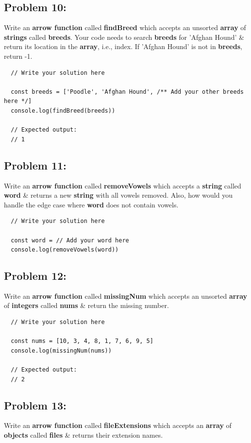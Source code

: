 \documentclass{article}
\begin{document}
\subsection*{Problem 10:} 
Write an \textbf{arrow function} called \textbf{findBreed} which accepts an unsorted \textbf{array} of \textbf{strings} called \textbf{breeds}. Your code needs to search \textbf{breeds} for 'Afghan Hound' \& return its location in the \textbf{array}, i.e., index. If 'Afghan Hound' is not in \textbf{breeds}, return -1.

\begin{verbatim}
  // Write your solution here

  const breeds = ['Poodle', 'Afghan Hound', /** Add your other breeds here */]
  console.log(findBreed(breeds)) 

  // Expected output:
  // 1
\end{verbatim}

\subsection*{Problem 11:} 
Write an \textbf{arrow function} called \textbf{removeVowels} which accepts a \textbf{string} called \textbf{word} \& returns a new \textbf{string} with all vowels removed. Also, how would you handle the edge case where \textbf{word} does not contain vowels.

\begin{verbatim}
  // Write your solution here

  const word = // Add your word here
  console.log(removeVowels(word))
\end{verbatim}

\subsection*{Problem 12:} 
Write an \textbf{arrow function} called \textbf{missingNum} which accepts an unsorted \textbf{array} of \textbf{integers} called \textbf{nums} \& return the missing number.

\begin{verbatim}
  // Write your solution here

  const nums = [10, 3, 4, 8, 1, 7, 6, 9, 5]
  console.log(missingNum(nums))

  // Expected output:
  // 2
\end{verbatim}

\subsection*{Problem 13:}
Write an \textbf{arrow function} called \textbf{fileExtensions} which accepts an \textbf{array} of \textbf{objects} called \textbf{files} \& returns their extension names.
\end{document}
